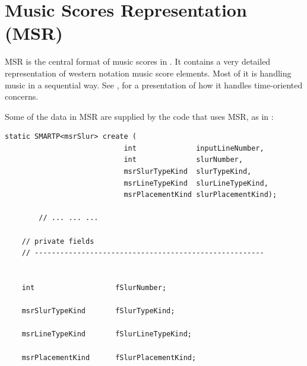 



\chapter{Music Scores Representation (MSR)}

MSR is the central format of music scores in \mf. It contains a very detailed representation of western notation music score elements. Most of it is handling music in a sequential way. See , for a presentation of how it handles time-oriented concerns.

Some of the data in MSR are supplied by the code that uses MSR, as in :
\begin{lstlisting}[language=CPlusPlus]
    static SMARTP<msrSlur> create (
                            int              inputLineNumber,
                            int              slurNumber,
                            msrSlurTypeKind  slurTypeKind,
                            msrLineTypeKind  slurLineTypeKind,
                            msrPlacementKind slurPlacementKind);

		// ... ... ...

    // private fields
    // ------------------------------------------------------


    int                   fSlurNumber;

    msrSlurTypeKind       fSlurTypeKind;

    msrLineTypeKind       fSlurLineTypeKind;

    msrPlacementKind      fSlurPlacementKind;
\end{lstlisting}

